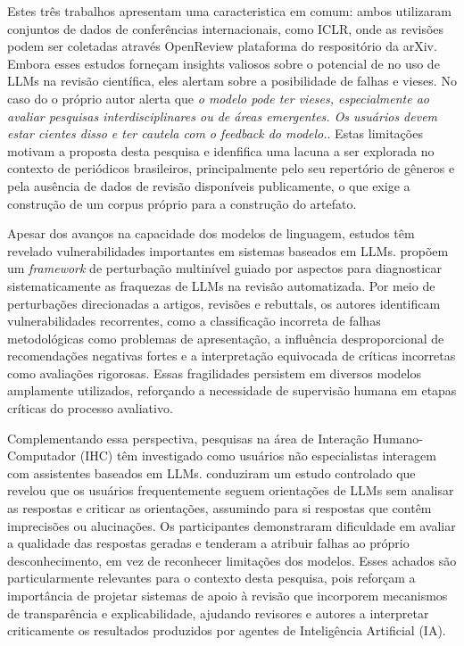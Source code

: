Estes três trabalhos apresentam uma caracteristica em comum: ambos utilizaram conjuntos de dados de conferências internacionais, como ICLR, onde as revisões podem ser coletadas através OpenReview plataforma do respositório da arXiv. Embora esses estudos forneçam insights valiosos sobre o potencial de no uso de LLMs na revisão científica, eles alertam sobre a posibilidade de falhas e vieses. No caso do \cite{DeepReview} o próprio autor alerta que \textit{o modelo pode ter vieses, especialmente ao avaliar pesquisas interdisciplinares ou de áreas emergentes. Os usuários devem estar cientes disso e ter cautela com o feedback do modelo.}. Estas limitações motivam a proposta desta pesquisa e idenfifica uma lacuna a ser explorada no contexto de periódicos brasileiros, principalmente pelo seu repertório de gêneros e pela ausência de dados de revisão disponíveis publicamente, o que exige a construção de um corpus próprio para a construção do artefato.

Apesar dos avanços na capacidade dos modelos de linguagem, estudos têm revelado vulnerabilidades importantes em sistemas baseados em LLMs. \cite{WhereLLMWrong} propõem um \textit{framework} de perturbação multinível guiado por aspectos para diagnosticar sistematicamente as fraquezas de LLMs na revisão automatizada. Por meio de perturbações direcionadas a artigos, revisões e rebuttals, os autores identificam vulnerabilidades recorrentes, como a classificação incorreta de falhas metodológicas como problemas de apresentação, a influência desproporcional de recomendações negativas fortes e a interpretação equivocada de críticas incorretas como avaliações rigorosas. Essas fragilidades persistem em diversos modelos amplamente utilizados, reforçando a necessidade de supervisão humana em etapas críticas do processo avaliativo.

Complementando essa perspectiva, pesquisas na área de Interação Humano-Computador (IHC) têm investigado como usuários não especialistas interagem com assistentes baseados em LLMs. \cite{WhyandWhen} conduziram um estudo controlado que revelou que os usuários frequentemente seguem orientações de LLMs sem analisar as respostas e criticar as orientações, assumindo para si respostas que contêm imprecisões ou alucinações. Os participantes demonstraram dificuldade em avaliar a qualidade das respostas geradas e tenderam a atribuir falhas ao próprio desconhecimento, em vez de reconhecer limitações dos modelos. Esses achados são particularmente relevantes para o contexto desta pesquisa, pois reforçam a importância de projetar sistemas de apoio à revisão que incorporem mecanismos de transparência e explicabilidade, ajudando revisores e autores a interpretar criticamente os resultados produzidos por agentes de Inteligência Artificial (IA).

